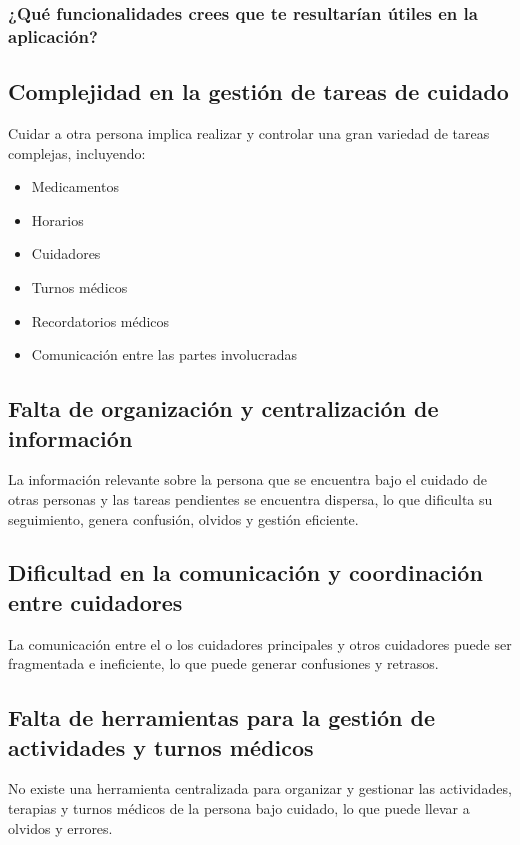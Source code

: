 \documentclass[a4paper,12pt]{article}
\begin{document}
    \subsubsection{¿Qué funcionalidades crees que te resultarían útiles en la aplicación?}
    \subsection{Complejidad en la gestión de tareas de cuidado}
    Cuidar a otra persona implica realizar y controlar una gran variedad de tareas complejas, incluyendo:
    \begin{itemize}
        \item Medicamentos
        \item Horarios
        \item Cuidadores
        \item Turnos médicos
        \item Recordatorios médicos
        \item Comunicación entre las partes involucradas
    \end{itemize}
    \subsection{Falta de organización y centralización de información}
    La información relevante sobre la persona que se encuentra bajo el cuidado de otras personas y las tareas pendientes se encuentra dispersa, lo que dificulta su seguimiento, genera confusión, olvidos y gestión eficiente.
    \subsection{Dificultad en la comunicación y coordinación entre cuidadores}
    La comunicación entre el o los cuidadores principales y otros cuidadores puede ser fragmentada e ineficiente, lo que puede generar confusiones y retrasos.
    \subsection{Falta de herramientas para la gestión de actividades y turnos médicos}
    No existe una herramienta centralizada para organizar y gestionar las actividades, terapias y turnos médicos de la persona bajo cuidado, lo que puede llevar a olvidos y errores.
\end{document}
